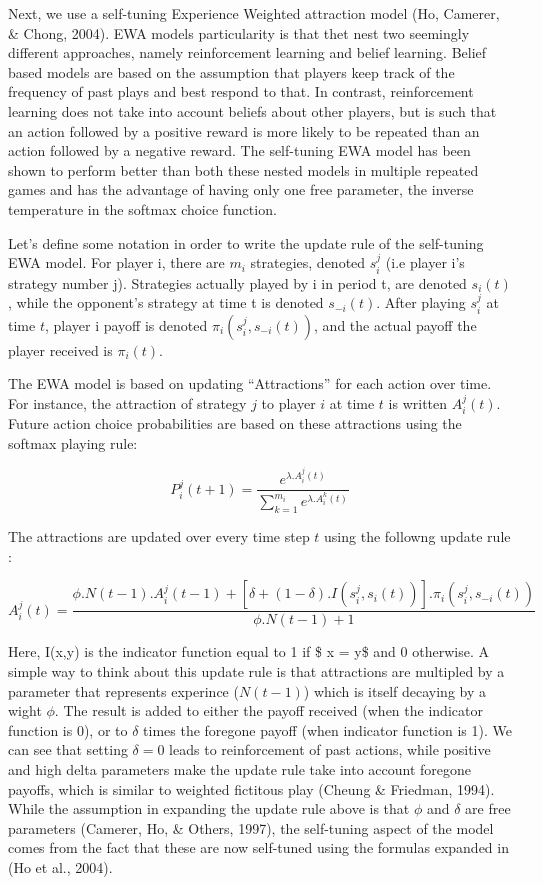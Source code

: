 \documentclass[man,floatsintext]{apa6}
\begin{document}
Next, we use a self-tuning Experience Weighted attraction model (Ho, Camerer, \& Chong, 2004). EWA models particularity is that thet nest two seemingly different approaches, namely reinforcement learning and belief learning. Belief based models are based on the assumption that players keep track of the frequency of past plays and best respond to that. In contrast, reinforcement learning does not take into account beliefs about other players, but is such that an action followed by a positive reward is more likely to be repeated than an action followed by a negative reward. The self-tuning EWA model has been shown to perform better than both these nested models in multiple repeated games and has the advantage of having only one free parameter, the inverse temperature in the softmax choice function.

Let's define some notation in order to write the update rule of the self-tuning EWA model. For player i, there are \(m_{i}\) strategies, denoted \(s_{i}^{j}\) (i.e player i's strategy number j). Strategies actually played by i in period t, are denoted \(s_{i}(t)\), while the opponent's strategy at time t is denoted \(s_{-i}(t)\). After playing \(s_{i}^{j}\) at time \(t\), player i payoff is denoted \(\pi_{i}(s_{i}^{j},s_{-i}(t))\), and the actual payoff the player received is \(\pi_{i}(t)\).

The EWA model is based on updating \enquote{Attractions} for each action over time. For instance, the attraction of strategy \(j\) to player \(i\) at time \(t\) is written \(A_{i}^{j}(t)\). Future action choice probabilities are based on these attractions using the softmax playing rule:

\[P_{i}^{j}(t+1) = \frac{e^{\lambda . A_{i}^{j}(t)}}{\sum_{k=1}^{m_{i}}e^{\lambda . A_{i}^{k}(t)}} \]

The attractions are updated over every time step \(t\) using the followng update rule :

\[ A_{i}^{j}(t) =  \frac{\phi . N(t-1) . A_{i}^{j}(t-1) + [ \delta + (1-\delta) . I(s_{i}^{j},s_{i}(t))] . \pi_{i}(s_{i}^{j},s_{-i}(t)) } {\phi . N(t-1) + 1} \]

Here, I(x,y) is the indicator function equal to 1 if \$ x = y\$ and 0 otherwise. A simple way to think about this update rule is that attractions are multipled by a parameter that represents experince (\(N(t-1)\)) which is itself decaying by a wight \(\phi\). The result is added to either the payoff received (when the indicator function is 0), or to \(\delta\) times the foregone payoff (when indicator function is 1). We can see that setting \(\delta = 0\) leads to reinforcement of past actions, while positive and high delta parameters make the update rule take into account foregone payoffs, which is similar to weighted fictitous play (Cheung \& Friedman, 1994).
While the assumption in expanding the update rule above is that \(\phi\) and \(\delta\) are free parameters (Camerer, Ho, \& Others, 1997), the self-tuning aspect of the model comes from the fact that these are now self-tuned using the formulas expanded in (Ho et al., 2004).
\end{document}
